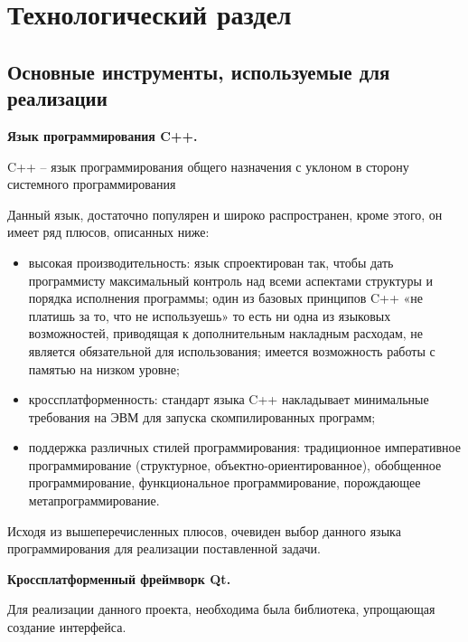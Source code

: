 \chapter{Технологический раздел}
\label{cha:impl}


\section{Основные инструменты, используемые для реализации}

\noindent\textbf{Язык программирования C++.}

C++ -- язык программирования общего назначения с уклоном в сторону системного программирования \cite{Cpp}

Данный язык, достаточно популярен и широко распространен, кроме этого, он имеет ряд плюсов, описанных ниже:

\begin{itemize}
	\item высокая производительность: язык спроектирован так, чтобы дать программисту максимальный контроль над всеми аспектами структуры и порядка исполнения программы; один из базовых принципов C++ «не платишь за то, что не используешь» то есть ни одна из языковых возможностей, приводящая к дополнительным накладным расходам, не является обязательной для использования; имеется возможность работы с памятью на низком уровне;
	\item кроссплатформенность: стандарт языка C++ накладывает минимальные требования на ЭВМ для запуска скомпилированных программ;
	\item поддержка различных стилей программирования: традиционное императивное программирование (структурное, объектно-ориентированное), обобщенное программирование, функциональное программирование, порождающее метапрограммирование.
\end{itemize}

Исходя из вышеперечисленных плюсов, очевиден выбор данного языка программирования для реализации поставленной задачи. %

\noindent\textbf{Кроссплатформенный фреймворк Qt.}

Для реализации данного проекта, необходима была библиотека, упрощающая создание интерфейса.

